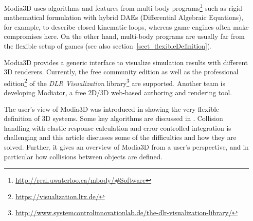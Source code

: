 Modia3D uses algorithms and features from multi-body
programs\footnote{\href{http://real.uwaterloo.ca/~mbody/\#Software}{http://real.uwaterloo.ca/mbody/\#Software}}
such as rigid mathematical formulation with hybrid DAEs (Differential Algebraic Equations), for example, to
describe closed kinematic loops, whereas game engines often make compromises here. On the other hand,
multi-body programs are usually far from the flexible setup of games (see also section~\ref{sect_flexibleDefinition}).

Modia3D provides a generic interface to visualize simulation results with different 3D renderers. Currently, the free community edition as well as the professional edition\footnote{\href{https://visualization.ltx.de/}{https://visualization.ltx.de/}} of the
\emph{DLR Visualization}  library\footnote{\href{http://www.systemcontrolinnovationlab.de/the-dlr-visualization-library/}{http://www.systemcontrolinnovationlab.de/the-dlr-visualization-library/}} \cite{bellmann2009, hellerer2014} are supported. Another team is developing Modiator, a free 2D/3D web-based authoring and rendering tool.

The user's view of Modia3D was introduced in \cite{Neumayr2018} showing the very flexible definition of 3D systems.
Some key algorithms are discussed in \cite{Neumayr2017,Neumayr2019}. Collision handling with elastic response calculation and error controlled integration
is challenging and this article discusses some of the difficulties and how they are solved. Further, it gives an overview of Modia3D from a user's perspective, and in particular how collisions between objects are defined.

\begin{table}[t]
	\label{table:ModiaPlatform} 
\end{table}

